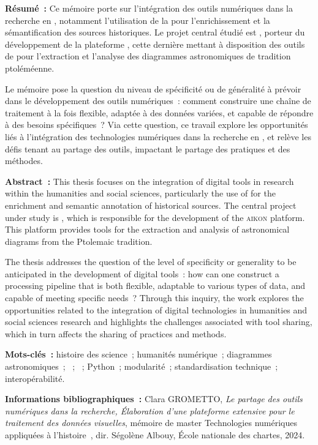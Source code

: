 \medskip	

\textbf{Résumé~:} Ce mémoire porte sur l'intégration des outils numériques dans la recherche en \shs, notamment l'utilisation de la \cv pour l'enrichissement et la sémantification des sources historiques. Le projet central étudié est \eida, porteur du développement de la plateforme \aikon, cette dernière mettant à disposition des outils de \dl pour l'extraction et l'analyse des diagrammes astronomiques de tradition ptoléméenne.

Le mémoire pose la question du niveau de spécificité ou de généralité à prévoir dans le développement des outils numériques~: comment construire une chaîne de traitement à la fois flexible, adaptée à des données variées, et capable de répondre à des besoins spécifiques~? Via cette question, ce travail explore les opportunités liés à l'intégration des technologies numériques dans la recherche en \shs, et relève les défis tenant au partage des outils, impactant le partage des pratiques et des méthodes. 

\medskip

\textbf{Abstract~:} This thesis focuses on the integration of digital tools in research within the humanities and social sciences, particularly the use of \cv for the enrichment and semantic annotation of historical sources. The central project under study is \eida, which is responsible for the development of the \textsc{aikon} platform. This platform provides \dl tools for the extraction and analysis of astronomical diagrams from the Ptolemaic tradition.

The thesis addresses the question of the level of specificity or generality to be anticipated in the development of digital tools~: how can one construct a processing pipeline that is both flexible, adaptable to various types of data, and capable of meeting specific needs~? Through this inquiry, the work explores the opportunities related to the integration of digital technologies in humanities and social sciences research and highlights the challenges associated with tool sharing, which in turn affects the sharing of practices and methods.

\medskip

\textbf{Mots-clés~:} histoire des science~; humanités numérique~; diagrammes astronomiques~; \ia~; \dl~; Python~; modularité~; standardisation technique~; interopérabilité.\\

\medskip

\textbf{Informations bibliographiques~:} Clara GROMETTO, \textit{Le partage des outils numériques dans la recherche, Élaboration d'une plateforme extensive pour le traitement des données visuelles}, mémoire de master \og Technologies numériques appliquées à l'histoire~\fg, dir. Ségolène Albouy, École nationale des chartes, 2024.
	
\clearemptydoublepage